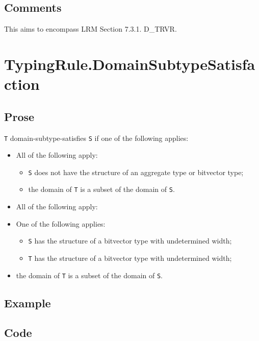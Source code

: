 \documentclass{book}
\begin{document}
\subsection{Comments}
  This aims to encompass LRM Section 7.3.1. D\_TRVR.

\section{TypingRule.DomainSubtypeSatisfaction}

\subsection{Prose}
 \texttt{T} domain-subtype-satisfies \texttt{S} if one of the following applies:
 \begin{itemize}
 \item All of the following apply:
    \begin{itemize}
    \item \texttt{S} does not have the structure of an aggregate type or bitvector type;
    \item the domain of \texttt{T} is a subset of the domain of \texttt{S}.
    \end{itemize}

  \item All of the following apply:
    \item One of the following applies:
      \begin{itemize}
      \item \texttt{S} has the structure of a bitvector type with undetermined width;
      \item \texttt{T} has the structure of a bitvector type with undetermined width;
      \end{itemize}
   \item the domain of \texttt{T} is a subset of the domain of \texttt{S}.
  \end{itemize}

  \subsection{Example}

  \subsection{Code}
\end{document}
